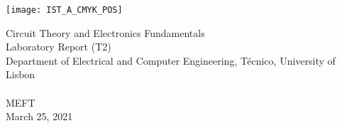 
\thispagestyle {empty}

\texttt{[image: IST\_A\_CMYK\_POS]}

\begin{center}
%
\vspace{1.0cm}

\vspace{1cm}
{\FontLb Circuit Theory and Electronics Fundamentals} \\ %
\vspace{1cm}
{\FontLb Laboratory Report (T2)} \\
\vspace{1cm}
{\FontSn Department of Electrical and Computer Engineering, Técnico, University of Lisbon} \\ %
\vspace{0.5cm}
{ } \\
\vspace{0.5cm}
{\FontSn MEFT } \\
\vspace{0.5cm}
{\FontSn March 25, 2021} \\ %
%
\end{center}

